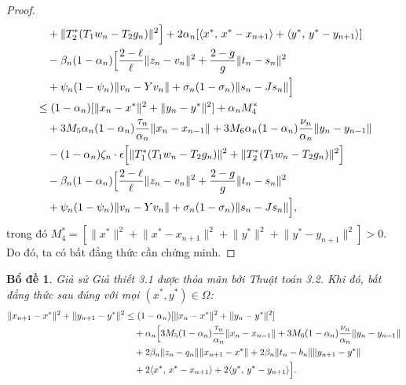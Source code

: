 \documentclass{MyBook}
\theoremstyle{plain}
\newtheorem{lemma}[theorem]{Bổ đề}
\theoremstyle{definition}
\theoremstyle{remark}
\numberwithin{equation}{chapter}
\newcommand{\inp}[2]{\langle #1,\,#2\rangle}
\newcommand{\nm}[1]{\lVert #1\rVert}
\begin{document}
\begin{proof}
\begin{align*}
&\quad +\nm{T_2^{*}(T_1w_n-T_2g_n)}^2\Bigr]+2\alpha_n[\inp{x^{*}}{x^{*}-x_{n+1}}+\inp{y^{*}}{y^{*}-y_{n+1}}]\\
&\quad -\beta_n(1-\alpha_n)\Bigl[\frac{2-\ell}{\ell}\nm{z_n-v_n}^2+\frac{2-g}{g}\nm{t_n-s_n}^2\\
&\quad +\psi_n(1-\psi_n)\nm{v_n-Yv_n}+\sigma_n(1-\sigma_n)\nm{s_n-Js_n}\Bigr]\\
&\le (1-\alpha_n)[\nm{x_n-x^{*}}^2+\nm{y_n-y^{*}}^2]+\alpha_n M_4^{*}\\
&\quad +3M_5\alpha_n(1-\alpha_n)\frac{\tau_n}{\alpha_n}\nm{x_n-x_{n-1}}+3M_6\alpha_n(1-\alpha_n)\frac{\nu_n}{\alpha_n}\nm{y_n-y_{n-1}}\\
&\quad -(1-\alpha_n)\zeta_n\cdot\epsilon\Bigl[\nm{T_1^{*}(T_1w_n-T_2g_n)}^2+\nm{T_2^{*}(T_1w_n-T_2g_n)}^2\Bigr]\\
&\quad -\beta_n(1-\alpha_n)\Bigl[\frac{2-\ell}{\ell}\nm{z_n-v_n}^2+\frac{2-g}{g}\nm{t_n-s_n}^2\\
&\quad +\psi_n(1-\psi_n)\nm{v_n-Yv_n}+\sigma_n(1-\sigma_n)\nm{s_n-Js_n}\Bigr],
\end{align*}
trong đó $M_4^{*}=[\nm{x^{*}}^2+\nm{x^{*}-x_{n+1}}^2+\nm{y^{*}}^2+\nm{y^{*}-y_{n+1}}^2]>0$. Do đó, ta có bất đẳng thức cần chứng minh.
\end{proof}

\begin{lemma}\label{lem:4.6}
Giả sử Giả thiết 3.1 được thỏa mãn bởi Thuật toán 3.2. Khi đó, bất đẳng thức sau đúng với mọi $(x^{*},y^{*})\in\Omega$:
\begin{align*}
\nm{x_{n+1}-x^{*}}^2+\nm{y_{n+1}-y^{*}}^2 &\le (1-\alpha_n)[\nm{x_n-x^{*}}^2+\nm{y_n-y^{*}}^2]\\
&\quad +\alpha_n\Bigl[3M_5(1-\alpha_n)\frac{\tau_n}{\alpha_n}\nm{x_n-x_{n-1}}+3M_6(1-\alpha_n)\frac{\nu_n}{\alpha_n}\nm{y_n-y_{n-1}}\\
&\quad +2\beta_n\nm{z_n-q_n}\nm{x_{n+1}-x^{*}}+2\beta_n\nm{t_n-b_n}\nm{y_{n+1}-y^{*}}\\
&\quad +2\inp{x^{*}}{x^{*}-x_{n+1}}+2\inp{y^{*}}{y^{*}-y_{n+1}}\Bigr].
\end{align*}
\end{lemma}
\end{document}
